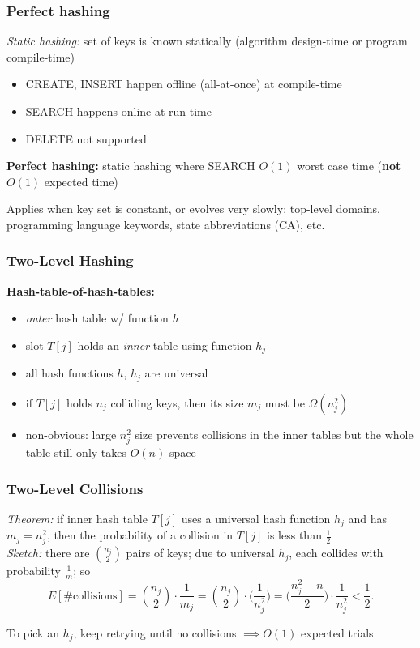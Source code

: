 \documentclass{beamer}
\begin{document}
\begin{frame} \frametitle{Perfect hashing}
\emph{Static hashing:} set of keys is known statically (algorithm design-time or
program compile-time)
\begin{itemize}
  \item CREATE, INSERT happen offline (all-at-once) at compile-time
  \item SEARCH happens online at run-time
  \item DELETE not supported
\end{itemize}

\textbf{Perfect hashing:} static hashing where SEARCH $O(1)$ worst case time
(\textbf{not} $O(1)$ expected time)

Applies when key set is constant, or evolves very slowly: top-level domains,
programming language keywords, state abbreviations (CA), etc.
\end{frame}

\begin{frame} \frametitle{Two-Level Hashing}
  \textbf{Hash-table-of-hash-tables:}
  \begin{itemize}
    \item \emph{outer} hash table w/ function $h$
    \item slot $T[j]$ holds an \emph{inner} table using function $h_j$
    \item all hash functions $h$, $h_j$ are universal
    \item if $T[j]$ holds $n_j$ colliding keys, then its size $m_j$ must be
      $\Omega(n_j^2)$
    \item non-obvious: large $n_j^2$ size prevents collisions in the inner
      tables but the whole table still only takes $O(n)$ space
  \end{itemize}
\end{frame}

\begin{frame} \frametitle{Two-Level Collisions}
\emph{Theorem:} if inner hash table $T[j]$ uses a universal hash function $h_j$
and has $m_j=n_j^2$, then the probability of a collision in $T[j]$ is less than $\frac{1}{2}$ \\
\emph{Sketch:} there are $\binom{n_j}{2}$ pairs of keys; due to universal $h_j$, each
collides with probability $\frac{1}{m}$; so
\[ E[\text{\# collisions}]
   = \binom{n_j}{2} \cdot \frac{1}{m_j}
   = \binom{n_j}{2} \cdot \big( \frac{1}{n_j^2} \big)
   = \big( \frac{n_j^2-n}{2} \big) \cdot \frac{1}{n_j^2}
   < \frac{1}{2}. \]

To pick an $h_j$, keep retrying until no collisions $\implies O(1)$ expected trials
\end{frame}
\end{document}
